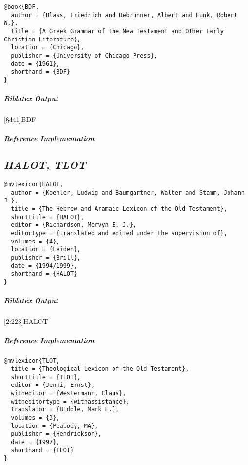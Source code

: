 \documentclass[a4paper]{article}
\newenvironment{biboutput}{%
  \subparagraph{Biblatex Output}
}{\color{black}}
\newenvironment{refimp}{%
  \subparagraph{Reference Implementation}
  \color{reference-colour}
  \rm
}{\par\color{black}}
\begin{document}
\medskip

\begin{lstlisting}
@book{BDF,
  author = {Blass, Friedrich and Debrunner, Albert and Funk, Robert W.},
  title = {A Greek Grammar of the New Testament and Other Early Christian Literature},
  location = {Chicago},
  publisher = {University of Chicago Press},
  date = {1961},
  shorthand = {BDF}
}
\end{lstlisting}

\begin{biboutput}
  [§441]{BDF}
\end{biboutput}

\begin{refimp}
\end{refimp}

\subsection{\emph{HALOT, TLOT}}

\begin{lstlisting}
@mvlexicon{HALOT,
  author = {Koehler, Ludwig and Baumgartner, Walter and Stamm, Johann J.},
  title = {The Hebrew and Aramaic Lexicon of the Old Testament},
  shorttitle = {HALOT},
  editor = {Richardson, Mervyn E. J.},
  editortype = {translated and edited under the supervision of},
  volumes = {4},
  location = {Leiden},
  publisher = {Brill},
  date = {1994/1999},
  shorthand = {HALOT}
}
\end{lstlisting}

\begin{biboutput}
  [2:223]{HALOT}
\end{biboutput}

\begin{refimp}
\end{refimp}

\medskip

\begin{lstlisting}
@mvlexicon{TLOT,
  title = {Theological Lexicon of the Old Testament},
  shorttitle = {TLOT},
  editor = {Jenni, Ernst},
  witheditor = {Westermann, Claus},
  witheditortype = {withassistance},
  translator = {Biddle, Mark E.},
  volumes = {3},
  location = {Peabody, MA},
  publisher = {Hendrickson},
  date = {1997},
  shorthand = {TLOT}
}
\end{lstlisting}
\end{document}
